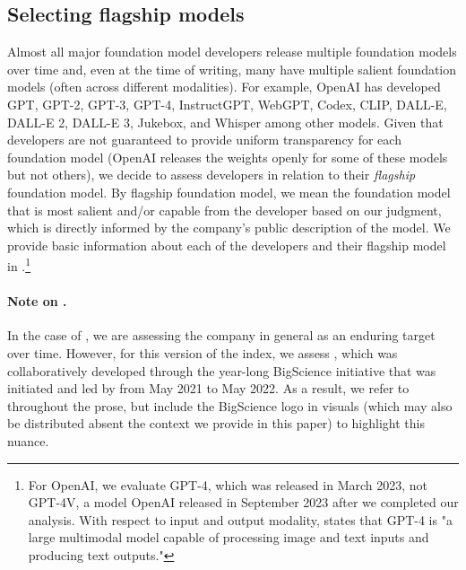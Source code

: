 \hypertarget{model-selection}{\subsection{Selecting flagship models}}
\label{sec:model-selection}
Almost all major foundation model developers release multiple foundation models over time and, even at the time of writing, many have multiple salient foundation models (often across different modalities).
For example, OpenAI has developed GPT, GPT-2, GPT-3, GPT-4, InstructGPT, WebGPT, Codex, CLIP, DALL-E, DALL-E 2, DALL-E 3, Jukebox, and Whisper among other models.
Given that developers are not guaranteed to provide uniform transparency for each foundation model (\eg OpenAI releases the weights openly for some of these models but not others), we decide to assess developers in relation to their \textit{flagship} foundation model.
By flagship foundation model, we mean the foundation model that is most salient and/or capable from the developer based on our judgment, which is directly informed by the company's public description of the model.
We provide basic information about each of the developers and their flagship model in .\footnote{For OpenAI, we evaluate GPT-4, which was released in March 2023, not GPT-4V, a model OpenAI released in September 2023 after we completed our analysis. With respect to input and output modality, \citet{openai2023gpt4} states that GPT-4 is "a large multimodal model capable of processing image and text inputs and producing text outputs."}

\paragraph{Note on \huggingface.}
In the case of \huggingface, we are assessing the company in general as an enduring target over time.
However, for this version of the index, we assess \bloomz \citep{muennighoff2022crosslingual}, which was collaboratively developed through the year-long BigScience initiative that was initiated and led by \huggingface from May 2021 to May 2022. 
As a result, we refer to \huggingface throughout the prose, but include the BigScience logo in visuals (which may also be distributed absent the context we provide in this paper) to highlight this nuance.
